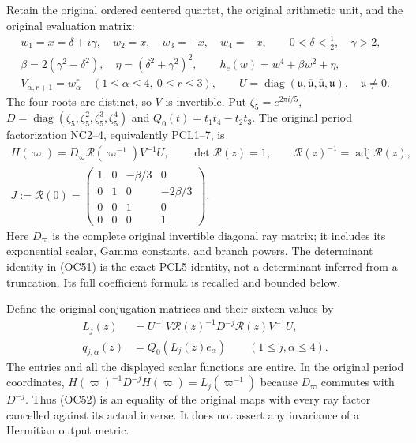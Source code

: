 \documentclass[11pt]{article}
\theoremstyle{remark}\newtheorem{remark}[theorem]{Remark}
\begin{document}
Retain the original ordered centered quartet, the original arithmetic unit,
and the original evaluation matrix:
\[
 \begin{gathered}
 w_1=x=\delta+i\gamma,\quad w_2=\bar x,\quad
 w_3=-\bar x,\quad w_4=-x,\qquad 0<\delta<\tfrac12,\quad\gamma>2,\\
 \beta=2(\gamma^2-\delta^2),\quad\eta=(\delta^2+\gamma^2)^2,
 \qquad h_c(w)=w^4+\beta w^2+\eta,\\
 V_{\alpha,r+1}=w_\alpha^r\quad(1\le\alpha\le4,\ 0\le r\le3),
 \qquad U=\operatorname{diag}(\mathfrak u,\overline{\mathfrak u},
                    \overline{\mathfrak u},\mathfrak u),\quad\mathfrak u\ne0.
 \end{gathered}\tag{OC50}\label{eq:OC50}
\]
The four roots are distinct, so $V$ is invertible. Put
$\zeta_5=e^{2\pi i/5}$,
$D=\operatorname{diag}(\zeta_5,\zeta_5^2,\zeta_5^3,\zeta_5^4)$ and
$Q_0(t)=t_1t_4-t_2t_3$. The original period factorization NC2--4,
equivalently PCL1--7, is
\[
 \begin{gathered}
 H(\varpi)=D_\varpi\mathcal R(\varpi^{-1})V^{-1}U,
 \qquad \det\mathcal R(z)=1,\qquad
 \mathcal R(z)^{-1}=\operatorname{adj}\mathcal R(z),\\
 J:=\mathcal R(0)=
 \begin{pmatrix}1&0&-\beta/3&0\\0&1&0&-2\beta/3\\
 0&0&1&0\\0&0&0&1\end{pmatrix}.
 \end{gathered}\tag{OC51}\label{eq:OC51}
\]
Here $D_\varpi$ is the complete original invertible diagonal ray matrix;
it includes its exponential scalar, Gamma constants, and branch powers.
The determinant identity in (OC51) is the exact PCL5 identity, not a
determinant inferred from a truncation. Its full coefficient formula is
recalled and bounded below.

Define the original conjugation matrices and their sixteen values by
\[
 \begin{split}
 L_j(z)&=U^{-1}V\mathcal R(z)^{-1}D^{-j}\mathcal R(z)V^{-1}U,\\
 q_{j,\alpha}(z)&=Q_0(L_j(z)e_\alpha)
       \qquad(1\le j,\alpha\le4).
 \end{split}\tag{OC52}\label{eq:OC52}
\]
The entries and all the displayed scalar functions are entire. In the
original period coordinates,
$H(\varpi)^{-1}D^{-j}H(\varpi)=L_j(\varpi^{-1})$ because
$D_\varpi$ commutes with $D^{-j}$. Thus (OC52) is an equality of the
original maps with every ray factor cancelled against its actual inverse.
It does not assert any invariance of a Hermitian output metric.
\end{document}

